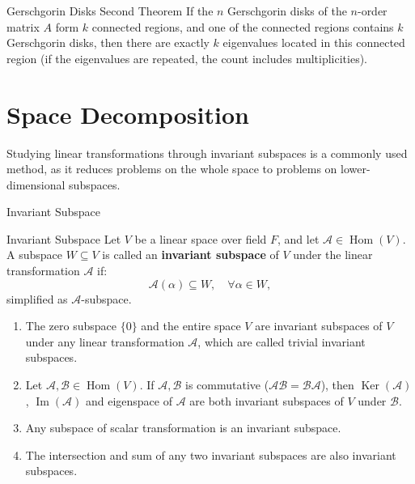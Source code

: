 \documentclass[11pt]{../../TexTemplate/elegantbook} %
\begin{document}
\begin{theorem}{Gerschgorin Disks Second Theorem}
    If the \(n\) Gerschgorin disks of the \(n\)-order matrix \(A\) form \(k\) connected regions,
    and one of the connected regions contains \(k\) Gerschgorin disks, 
    then there are exactly \(k\) eigenvalues located in this connected region (if the eigenvalues are repeated, 
    the count includes multiplicities).
\end{theorem}


\section{Space Decomposition}
Studying linear transformations through invariant subspaces is a commonly used method, 
as it reduces problems on the whole space to problems on lower-dimensional subspaces.
\begin{leftbarTitle}{Invariant Subspace}\end{leftbarTitle}
\begin{definition}{Invariant Subspace}
    Let \( V \) be a linear space over field \( F \), 
    and let \( \mathcal{A}\in \operatorname{Hom}(V) \).
    A subspace \( W \subseteq V \) is called an \textbf{invariant subspace} of \( V \)
    under the linear transformation \( \mathcal{A} \) if:
    \[
    \mathcal{A}(\alpha) \subseteq W, \quad \forall \alpha \in W,
    \]
    simplified as \( \mathcal{A} \)-subspace.
\end{definition}

\begin{property}
    \begin{enumerate}
        \item The zero subspace \( \{0\} \) and the entire space \( V \) are invariant subspaces of \( V \) 
            under any linear transformation \( \mathcal{A} \), which are called trivial invariant subspaces. 
        \item Let \( \mathcal{A}, \mathcal{B} \in \operatorname{Hom}(V) \). 
            If \( \mathcal{A}, \mathcal{B} \) is commutative (\( \mathcal{AB} = \mathcal{BA} \)), 
            then \( \operatorname{Ker}(\mathcal{A}) \), \( \operatorname{Im}(\mathcal{A}) \) and 
            eigenspace of \( \mathcal{A} \) are both invariant subspaces of \( V \) under \( \mathcal{B} \).
        \item Any subspace of scalar transformation is an invariant subspace.
        \item The intersection and sum of any two invariant subspaces are also invariant subspaces.
    \end{enumerate}
\end{property}
\end{document}
